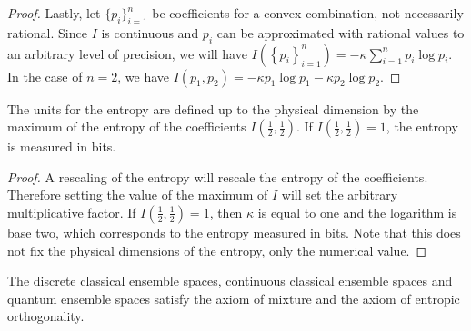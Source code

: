 \begin{proof}
	Lastly, let $\{p_i\}_{i=1}^{n}$ be coefficients for a convex combination, not necessarily rational. Since $I$ is continuous and $p_i$ can be approximated with rational values to an arbitrary level of precision, we will have $I\left(\left\{ p_i\right\}_{i=1}^{n}\right) = - \kappa \sum_{i=1}^{n} p_i \log p_i$. In the case of $n=2$, we have $I(p_1, p_2) = - \kappa p_1 \log p_1 - \kappa p_2 \log p_2$.	
\end{proof}

\begin{coro}
	The units for the entropy are defined up to the physical dimension by the maximum of the entropy of the coefficients $I\left(\frac{1}{2}, \frac{1}{2}\right)$. If $I\left(\frac{1}{2}, \frac{1}{2}\right) = 1$, the entropy is measured in bits.
\end{coro}

\begin{proof}
	A rescaling of the entropy will rescale the entropy of the coefficients. Therefore setting the value of the maximum of $I$ will set the arbitrary multiplicative factor. If $I\left(\frac{1}{2}, \frac{1}{2}\right) = 1$, then $\kappa$ is equal to one and the logarithm is base two, which corresponds to the entropy measured in bits. Note that this does not fix the physical dimensions of the entropy, only the numerical value.
\end{proof}

\begin{prop}
	The discrete classical ensemble spaces, continuous classical ensemble spaces and quantum ensemble spaces satisfy the axiom of mixture and the axiom of entropic orthogonality.
\end{prop}

